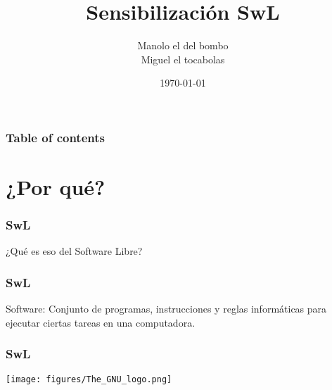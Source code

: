 \documentclass{beamer}
\title{Sensibilización SwL}
\author{Manolo el del bombo\\Miguel el tocabolas}
\date{\today}
\begin{document}
\begin{frame}
    \titlepage
\end{frame}

\begin{frame} \frametitle{Table of contents}
    \tableofcontents
\end{frame}


\section{¿Por qué?}

\begin{frame}\frametitle{SwL}
    ¿Qué es eso del Software Libre?
\end{frame}


\begin{frame}\frametitle{SwL}

    Software: \pause Conjunto de programas,
    instrucciones y reglas informáticas para
    ejecutar ciertas tareas en una computadora.

\end{frame}

\begin{frame}\frametitle{SwL}

    \texttt{[image: figures/The\_GNU\_logo.png]}
    
\end{frame}
\end{document}
